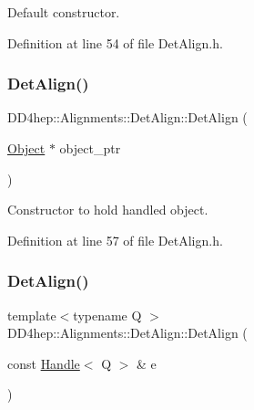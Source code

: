 Default constructor. 



Definition at line 54 of file Det\+Align.\+h.

\hypertarget{class_d_d4hep_1_1_alignments_1_1_det_align_a8b7b85c54d99bcc7e3f0535a4833780e}{}\label{class_d_d4hep_1_1_alignments_1_1_det_align_a8b7b85c54d99bcc7e3f0535a4833780e} 
\subsubsection{\texorpdfstring{Det\+Align()}{DetAlign()}\hspace{0.1cm}{\footnotesize\ttfamily [2/5]}}
{\footnotesize\ttfamily D\+D4hep\+::\+Alignments\+::\+Det\+Align\+::\+Det\+Align (\begin{DoxyParamCaption}\item[{\hyperlink{class_d_d4hep_1_1_alignments_1_1_det_align_ae49c039feb46ce85c64fecb6cf669f45}{Object} $\ast$}]{object\+\_\+ptr }\end{DoxyParamCaption})\hspace{0.3cm}{\ttfamily [inline]}}



Constructor to hold handled object. 



Definition at line 57 of file Det\+Align.\+h.

\hypertarget{class_d_d4hep_1_1_alignments_1_1_det_align_a51eaf73691c55dc1e6e925e3db4bd5c2}{}\label{class_d_d4hep_1_1_alignments_1_1_det_align_a51eaf73691c55dc1e6e925e3db4bd5c2} 
\subsubsection{\texorpdfstring{Det\+Align()}{DetAlign()}\hspace{0.1cm}{\footnotesize\ttfamily [3/5]}}
{\footnotesize\ttfamily template$<$typename Q $>$ \\
D\+D4hep\+::\+Alignments\+::\+Det\+Align\+::\+Det\+Align (\begin{DoxyParamCaption}\item[{const \hyperlink{class_d_d4hep_1_1_handle}{Handle}$<$ Q $>$ \&}]{e }\end{DoxyParamCaption})\hspace{0.3cm}{\ttfamily [inline]}}



